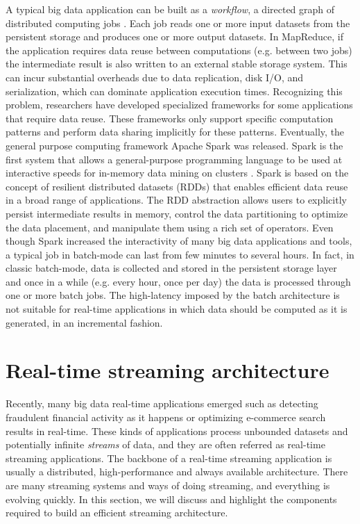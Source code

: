 A typical big data application can be built as a \emph{workflow}, a directed graph of distributed computing jobs \cite{bigdataatlinkedin}. Each job reads one or more input datasets from the persistent storage and produces one or more output datasets. In MapReduce, if the application requires data reuse between computations (e.g. between two jobs) the intermediate result is also written to an external stable storage system. This can incur substantial overheads due to data replication, disk I/O, and serialization, which can dominate application execution times. Recognizing this problem, researchers have developed specialized frameworks for some applications that require data reuse. These frameworks only support specific computation patterns and perform data sharing implicitly for these patterns. Eventually, the general purpose computing framework Apache Spark \cite{apachespark} was released. Spark is the first system that allows a general-purpose programming language to be used at interactive speeds for in-memory data mining on clusters \cite{apachespark}. Spark is based on the concept of resilient distributed datasets (RDDs) \cite{apachesparkrdd} that enables efficient data reuse in a broad range of applications. The RDD abstraction allows users to explicitly persist intermediate results in memory, control the data partitioning to optimize the data placement, and manipulate them using a rich set of operators. Even though Spark increased the interactivity of many big data applications and tools, a typical job in batch-mode can last from few minutes to several hours. In fact, in classic batch-mode, data is collected and stored in the persistent storage layer and once in a while (e.g. every hour, once per day) the data is processed through one or more batch jobs. The high-latency imposed by the batch architecture is not suitable for real-time applications in which data should be computed as it is generated, in an incremental fashion.

\section{Real-time streaming architecture}
Recently, many big data real-time applications emerged such as detecting fraudulent financial activity as it happens or optimizing e-commerce search results in real-time. These kinds of applications process unbounded datasets and potentially infinite \emph{streams} of data, and they are often  referred as real-time streaming applications. The backbone of a real-time streaming application is usually a distributed, high-performance and always available architecture. There are many streaming systems and ways of doing streaming, and everything is evolving quickly. In this section, we will discuss and highlight the components required to build an efficient streaming architecture.



